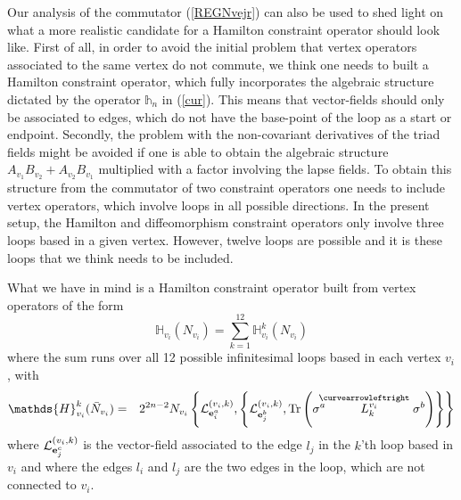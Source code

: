 \documentclass[12pt]{article}
\newcommand{\nn}{\nonumber}
\def\cl{{\cal L}}
\begin{document}
\begin{appendix}
Our analysis of the commutator (\ref{REGNvejr}) can also be used to shed light on what a more realistic candidate for a Hamilton constraint operator should look like. First of all, in order to avoid the initial problem that vertex operators associated to the same vertex do not commute, we think one needs to built a Hamilton constraint operator, which fully incorporates the algebraic structure dictated by the operator $\mathds{h}_n$ in (\ref{cur}). This means that vector-fields should only be associated to edges, which do not have the base-point of the loop as a start or endpoint. Secondly, the problem with the non-covariant derivatives of the triad fields might be avoided if one is able to obtain the algebraic structure $A_{v_1}B_{v_2} + A_{v_2}B_{v_1}$ multiplied with a factor involving the lapse fields. To obtain this structure from the commutator of two constraint operators one needs to include vertex operators, which involve loops in all possible directions. In the present setup, the Hamilton and diffeomorphism constraint operators only involve three loops based in a given vertex. However, twelve loops are possible and it is these loops that we think needs to be included.


What we have in mind is a Hamilton constraint operator built from vertex operators of the form
$$
 \mathds{H}_{v_i}(N_{v_i}) =  \sum_{k=1}^{12}   \mathds{H}^{k}_{v_i}(N_{v_i})    
$$
where the sum runs over all 12 possible infinitesimal loops based in each vertex $v_i$, with
\begin{eqnarray}
 \mathds{H}^{k}_{v_i}(\bar{N}_{v_i}) 
 &=& 2^{2n-2}  N_{v_i}  \left\{ \cl^{(v_i,k)}_{{\bf e}^a_i} , \left\{ \cl^{(v_i,k)}_{{\bf e}^b_j}  , \mbox{Tr} \left(  \sigma^a \stackrel{\hspace{-3mm}\curvearrowleftright}{L^{v_i}_{k}  }   \sigma^b     \right) \right\} \right\}
\end{eqnarray}
where $\cl^{(v_i,k)}_{{\bf e}^c_j} $ is the vector-field associated to the edge $l_j$ in the $k$'th loop based in $v_i$ and where the edges $l_i$ and $l_j$ are the two edges in the loop, which are not connected to $v_i$.


\end{appendix}
\end{document}
